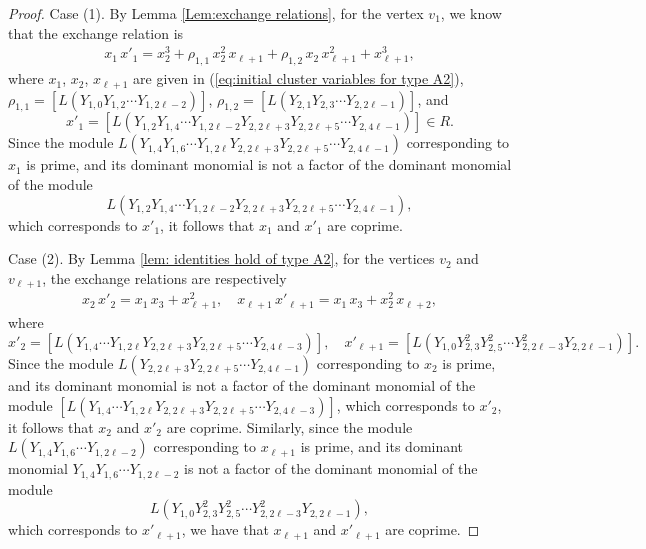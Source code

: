 \documentclass[11pt, reqno]{amsart}
\theoremstyle{plain}
\theoremstyle{definition}
\numberwithin{equation}{section}
\begin{document}
\begin{proof}
Case (1). By Lemma \ref{Lem:exchange relations}, for the vertex $v_1$, we know that the exchange relation is
\begin{align*}
x_1\,x'_1=x_2^3+\rho_{1,1}\,x_2^2\,x_{\ell+1}+\rho_{1,2}\,x_2\,x_{\ell+1}^2+x_{\ell+1}^3,
\end{align*} 
where $x_1$, $x_2$, $x_{\ell+1}$ are given in (\ref{eq:initial cluster variables for type A2}), $\rho_{1,1}=[L(Y_{1,0}Y_{1,2}\cdots Y_{1, 2 \ell-2})]$, $\rho_{1,2}=[L(Y_{2,1}Y_{2,3}\cdots Y_{2, 2 \ell-1})]$, and 
\[x'_1= [L(Y_{1,2}Y_{1,4}\cdots Y_{1, 2 \ell-2}Y_{2,2 \ell+3}Y_{2,2 \ell+5}\cdots Y_{2,4 \ell-1})]\in R.
\]
Since the module $L(Y_{1,4}Y_{1,6}\cdots Y_{1, 2 \ell}Y_{2,2\ell+3}Y_{2,2\ell+5}\cdots Y_{2,4\ell -1})$ corresponding to $x_1$ is prime, and its dominant monomial is not a factor of the dominant monomial of the module 
\[
L(Y_{1,2}Y_{1,4}\cdots Y_{1, 2 \ell-2}Y_{2,2 \ell+3}Y_{2,2 \ell+5}\cdots Y_{2,4 \ell-1}),
\] 
which corresponds to $x'_1$, it follows that $x_1$ and $x'_1$ are coprime.

Case (2). By Lemma \ref{lem: identities hold of type A2}, for the vertices $v_2$ and $v_{\ell+1}$, the exchange relations are respectively
\begin{align*}
x_2\,x'_2 = x_1\,x_3 + x_{\ell+1}^2, \quad 
x_{\ell+1}\,x'_{\ell+1} = x_1\,x_3 + x_2^2\,x_{\ell+2},
\end{align*}
where
\[
x'_2 = [L(Y_{1,4}\cdots Y_{1, 2 \ell}Y_{2,2 \ell+3}Y_{2,2 \ell+5}\cdots Y_{2,4 \ell-3})],\quad
x'_{\ell+1} = [L(Y_{1,0}Y_{2,3}^2Y_{2,5}^2\cdots Y_{2,2 \ell-3}^2 Y_{2,2 \ell-1})].
\]
Since the module $L(Y_{2,2\ell+3}Y_{2,2\ell+5}\cdots Y_{2,4\ell -1})$ corresponding to $x_2$ is prime, and its dominant monomial is not a factor of the dominant monomial of the module $[L(Y_{1,4}\cdots Y_{1, 2 \ell}Y_{2,2 \ell+3}Y_{2,2 \ell+5}\cdots Y_{2,4 \ell-3})]$, which corresponds to $x'_2$, it follows that $x_2$ and $x'_2$ are coprime. Similarly, since the module $L(Y_{1,4}Y_{1,6}\cdots Y_{1,2\ell-2})$ corresponding to $x_{\ell+1}$ is prime, and its dominant monomial $Y_{1,4}Y_{1,6}\cdots Y_{1,2\ell-2}$ is not a factor of the dominant monomial of the module
\[
L(Y_{1,0}Y_{2,3}^2Y_{2,5}^2\cdots Y_{2,2\ell-3}^2Y_{2,2\ell-1}),
\]
which corresponds to $x'_{\ell+1}$, we have that $x_{\ell+1}$ and $x'_{\ell+1}$ are coprime.


\end{proof}
\end{document}
